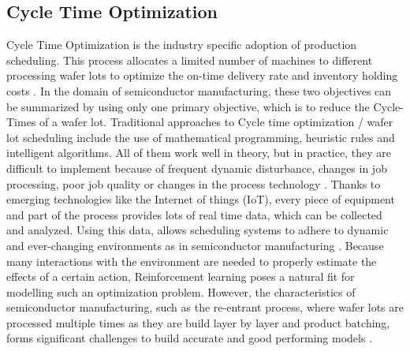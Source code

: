 \documentclass{Academic}
\begin{document}
    \subsection{Cycle Time Optimization}
    Cycle Time Optimization is the industry specific adoption of production scheduling. This process allocates a limited number of machines to different processing wafer lots to optimize the on-time delivery rate and inventory holding costs \cite{wang_fuzzy_2021}. In the domain of semiconductor manufacturing, these two objectives can be summarized by using only one primary objective, which is to reduce the Cycle-Times of a wafer lot. Traditional approaches to Cycle time optimization / wafer lot scheduling include the use of mathematical programming, heuristic rules and intelligent algorithms. All of them work well in theory, but in practice, they are difficult to implement because of frequent dynamic disturbance, changes in job processing, poor job quality or changes in the process technology \cite{wang_fuzzy_2021}. Thanks to emerging technologies like the Internet of things (IoT), every piece of equipment and part of the process provides lots of real time data, which can be collected and analyzed. Using this data, allows scheduling systems to adhere to dynamic and ever-changing environments as in semiconductor manufacturing \cite{wang_fuzzy_2021}. Because many interactions with the environment are needed to properly estimate the effects of a certain action, Reinforcement learning poses a natural fit for modelling such an optimization problem. However, the characteristics of semiconductor manufacturing, such as the re-entrant process, where wafer lots are processed multiple times as they are build layer by layer and product batching, forms significant challenges to build accurate and good performing models \cite{wang_fuzzy_2021}.
\end{document}

